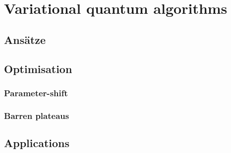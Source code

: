 \chapter{Variational quantum algorithms}

\section{Ansätze}

\section{Optimisation}
\subsection{Parameter-shift}
\subsection{Barren plateaus}

\section{Applications}